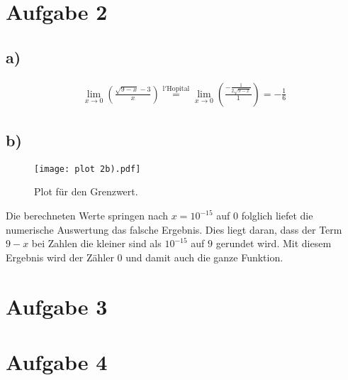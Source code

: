 \section{Aufgabe 2}
\subsection{a)}

\begin{align}
  \lim_{x \to 0}\left(\frac{\sqrt{9-x}-3}{x}\right)\stackrel{\mathrm{l'Hopital}}{=}
  \lim_{x \to 0}\left(\frac{-\frac{1}{2\sqrt{9-x}}}{1}\right)=-\frac{1}{6}
\end{align}


\subsection{b)}

\begin{figure}
  \centering
  \texttt{[image: plot 2b).pdf]}
  \caption{Plot für den Grenzwert.}
  \label{fig:2b}
\end{figure}

Die berechneten Werte springen nach $x=10^{-15}$ auf $0$ folglich liefet die
numerische Auswertung das falsche Ergebnis. Dies liegt daran, dass
der Term $9-x$ bei Zahlen die kleiner sind als $10^{-15}$ auf $9$ gerundet wird.
Mit diesem Ergebnis wird der Zähler $0$ und damit auch die ganze Funktion.        

\section{Aufgabe 3}

\section{Aufgabe 4}


